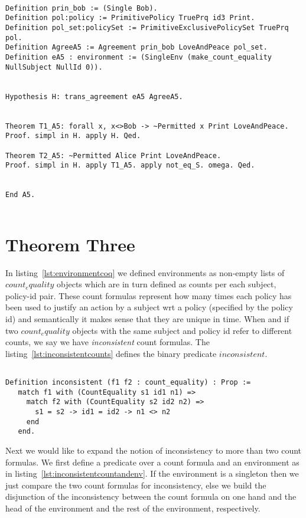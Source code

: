 \lstset{language=Coq}
\begin{lstlisting}[frame=single, caption={Theorem Two},label={lst:theoremtwo}]

Definition prin_bob := (Single Bob).
Definition pol:policy := PrimitivePolicy TruePrq id3 Print.
Definition pol_set:policySet := PrimitiveExclusivePolicySet TruePrq pol.
Definition AgreeA5 := Agreement prin_bob LoveAndPeace pol_set.
Definition eA5 : environment := (SingleEnv (make_count_equality NullSubject NullId 0)).


Hypothesis H: trans_agreement eA5 AgreeA5.


Theorem T1_A5: forall x, x<>Bob -> ~Permitted x Print LoveAndPeace.
Proof. simpl in H. apply H. Qed.

Theorem T2_A5: ~Permitted Alice Print LoveAndPeace.
Proof. simpl in H. apply T1_A5. apply not_eq_S. omega. Qed.


End A5.


\end{lstlisting}


\section{Theorem Three}

In listing~\ref{lst:environmentcoq} we defined environments as non-empty lists of $count_equality$ objects which are in turn defined as counts per each subject, policy-id pair. These count formulas represent how many times each policy has been used to justify an action by a subject wrt a policy (specified by the policy id) and semantically it makes sense that they are unique in time. When and if two $count_equality$ objects with the same subject and policy id refer to different counts, we say we have \emph{inconsistent} count formulas. The listing~\ref{lst:inconsistentcounts} defines the binary predicate $inconsistent$.

\lstset{language=Coq}
\begin{lstlisting}[frame=single, caption={Inconsistent Count Formulas}, label={lst:inconsistentcounts}]

Definition inconsistent (f1 f2 : count_equality) : Prop :=
   match f1 with (CountEquality s1 id1 n1) =>
     match f2 with (CountEquality s2 id2 n2) =>       
       s1 = s2 -> id1 = id2 -> n1 <> n2
     end 
   end.

\end{lstlisting}


Next we would like to expand the notion of inconsistency to more than two count formulas. We first define a predicate over a count formula and an environment as in listing~\ref{lst:inconsistentcountandenv}. If the environment is a singleton then we just compare the two count formulas for inconsistency, else we build the disjunction of the inconsistency between the count formula on one hand and the head of the environment and the rest of the environment, respectively. 

